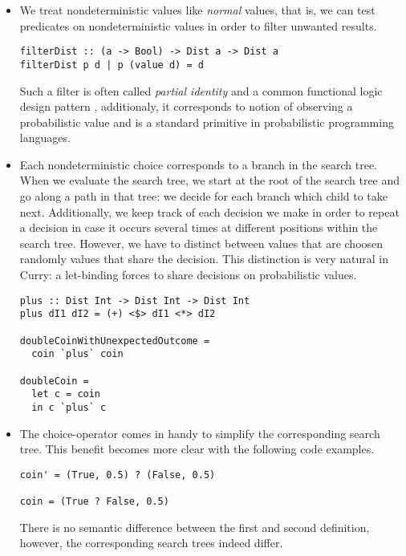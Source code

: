 \documentclass[
12pt, %
a4paper, %
oneside, %
]{llncs}
\begin{document}
\begin{itemize}

\item We treat nondeterministic values like \emph{normal} values, that
  is, we can test predicates on nondeterministic values in order to
  filter unwanted results. %

\begin{verbatim}
filterDist :: (a -> Bool) -> Dist a -> Dist a
filterDist p d | p (value d) = d
\end{verbatim}

  Such a filter is often called \emph{partial identity} and a common
  functional logic design pattern \cite{funcLogPattern}, additionaly,
  it corresponds to notion of observing a probabilistic value and is a
  standard primitive in probabilistic programming languages. %
 
\item Each nondeterministic choice corresponds to a branch in the
  search tree. %
  When we evaluate the search tree, we start at the root of the search
  tree and go along a path in that tree: we decide for each branch
  which child to take next. %
  Additionally, we keep track of each decision we make in order to
  repeat a decision in case it occurs several times at different
  positions within the search tree. %
  However, we have to distinct between values that are choosen
  randomly values that share the decision. %
  This distinction is very natural in Curry: a let-binding forces to
  share decisions on probabilistic values. %

\begin{verbatim}
plus :: Dist Int -> Dist Int -> Dist Int
plus dI1 dI2 = (+) <$> dI1 <*> dI2

doubleCoinWithUnexpectedOutcome =
  coin `plus` coin

doubleCoin =
  let c = coin
  in c `plus` c
\end{verbatim}

\item The choice-operator comes in handy to simplify the corresponding
  search tree. %
  This benefit becomes more clear with the following code examples. %

\begin{verbatim}
coin' = (True, 0.5) ? (False, 0.5)

coin = (True ? False, 0.5)
\end{verbatim}

  There is no semantic difference between the first and second
  definition, however, the corresponding search trees indeed differ. %


\end{itemize}
\end{document}
